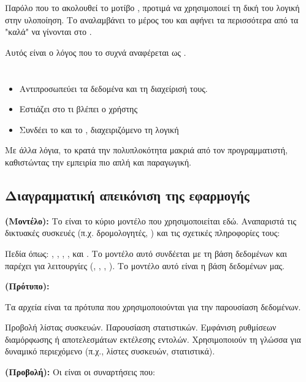 Παρόλο που το  ακολουθεί το μοτίβο , προτιμά να χρησιμοποιεί τη δική του λογική στην υλοποίηση. Το  αναλαμβάνει το  
μέρος του  και αφήνει τα περισσότερα από τα "καλά" να γίνονται στο .

Αυτός είναι ο λόγος που το  συχνά αναφέρεται ως .


\section{}
\begin{itemize}
    \item {} Αντιπροσωπεύει τα δεδομένα και τη διαχείρισή τους.  
    \item {} Εστιάζει στο τι βλέπει ο χρήστης 
    \item {} Συνδέει το  και το , διαχειριζόμενο τη λογική
\end{itemize}

Με άλλα λόγια, το  κρατά την πολυπλοκότητα μακριά από τον προγραμματιστή, καθιστώντας την εμπειρία πιο απλή και παραγωγική.

\subsection{Διαγραμματική απεικόνιση της εφαρμογής}

\textbf{(Μοντέλο):}
Το  είναι το κύριο μοντέλο που χρησιμοποιείται εδώ. Αναπαριστά τις δικτυακές συσκευές (π.χ. δρομολογητές, ) και τις σχετικές πληροφορίες τους:

Πεδία όπως: , , , , και .
Το μοντέλο αυτό συνδέεται με τη βάση δεδομένων και παρέχει  για  λειτουργίες (, , , ). Το μοντέλο αυτό είναι η βάση δεδομένων μας.

\textbf{ (Πρότυπο):}

Τα αρχεία  είναι τα πρότυπα που χρησιμοποιούνται για την παρουσίαση δεδομένων. 

Προβολή λίστας συσκευών.
Παρουσίαση στατιστικών.
Εμφάνιση ρυθμίσεων διαμόρφωσης ή αποτελεσμάτων εκτέλεσης εντολών.
Χρησιμοποιούν τη γλώσσα  για δυναμικό περιεχόμενο (π.χ., λίστες συσκευών, στατιστικά).

\textbf{ (Προβολή):}
Οι  είναι οι  συναρτήσεις που:

